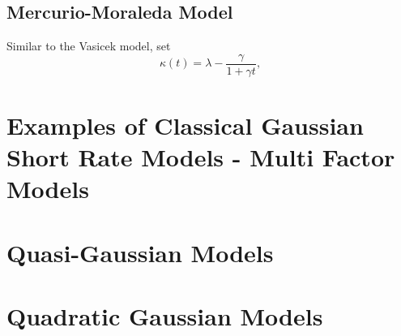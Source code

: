 \documentclass[12pt]{article}
\begin{document}
  \subsection{Mercurio-Moraleda Model}

  Similar to the Vasicek model, set
  \begin{equation}
    \kappa(t)=\lambda-\frac{\gamma}{1+\gamma t},
  \end{equation}
    
    
    
\section{Examples of Classical Gaussian Short Rate Models - Multi Factor Models}

    
    
    
    
    
    
    
    
    
    
    
    
    
    
    
    
    
    


\section{Quasi-Gaussian Models}


\section{Quadratic Gaussian Models}
\end{document}
